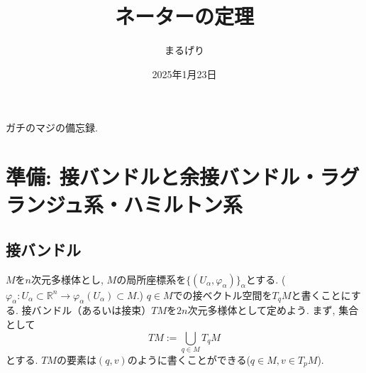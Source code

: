 \documentclass[a4paper]{ujarticle}
\title{ネーターの定理}
\numberwithin{equation}{section}
\theoremstyle{definition}
\begin{document}
\date{2025年1月23日}
\author{まるげり}
\setcounter{section}{-1}
\maketitle
    ガチのマジの備忘録.

    \section{準備: 接バンドルと余接バンドル・ラグランジュ系・ハミルトン系}
        \subsection{接バンドル}
        $M$を$n$次元多様体とし, $M$の局所座標系を$\{(U_{\alpha}, \varphi_{\alpha})\}_{\alpha}$とする.
        ($\varphi_{\alpha} : U_{\alpha} \subset \mathbb{R}^n \rightarrow \varphi_{\alpha}(U_{\alpha}) \subset M$.)
        $q \in M$での接ベクトル空間を$T_q M$と書くことにする.
        接バンドル（あるいは接束）$TM$を$2n$次元多様体として定めよう. 
        まず, 集合として
        \[
            TM := \bigcup_{q \in M} T_{q} M
        \]
        とする. $TM$の要素は$(q, v)$のように書くことができる($q \in M, v \in T_p M$). 
\end{document}
